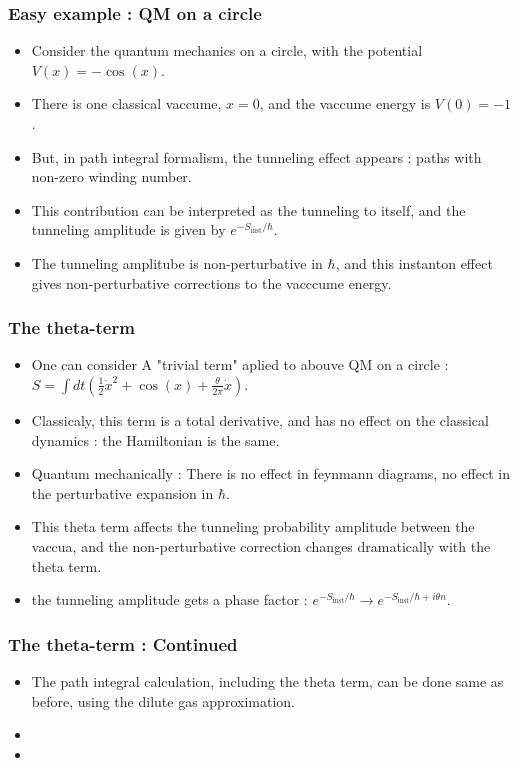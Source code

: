 \documentclass[10pt]{beamer}
\begin{document}
\begin{frame}
    \frametitle{Easy example : QM on a circle}
    \begin{itemize}
    \item Consider the quantum mechanics on a circle, with the potential $V(x) = -\cos(x)$.
    \item There is one classical vaccume, $x = 0$, and the vaccume energy is $V(0) = -1$.
    \item But, in path integral formalism, the tunneling effect appears : paths with non-zero winding number.
    \item This contribution can be interpreted as the tunneling to itself, and the tunneling amplitude is given by $e^{-S_{\text{inst}}/\hbar}$.
    \item The tunneling amplitube is non-perturbative in $\hbar$, and this instanton effect gives non-perturbative corrections to the vacccume energy.
    \end{itemize}
    \end{frame}

\begin{frame}
    \frametitle{The theta-term}
    \begin{itemize}
    \item One can consider A "trivial term" aplied to abouve QM on a circle : $S= \int dt \left(\frac{1}{2}\dot{x}^2 + \cos(x) + \frac{\theta}{2\pi} \dot{x}\right)$.
    \item Classicaly, this term is a total derivative, and has no effect on the classical dynamics : the Hamiltonian is the same.
    \item Quantum mechanically : There is no effect in feynmann diagrams, no effect in the perturbative expansion in $\hbar$.
    \item This theta term affects the tunneling probability amplitude between the vaccua, and the non-perturbative correction changes dramatically with the theta term.
    \item the tunneling amplitude gets a phase factor : $e^{-S_{\text{inst}}/\hbar} \rightarrow e^{-S_{\text{inst}}/\hbar + i\theta n}$.
    \end{itemize}
    \end{frame}


\begin{frame}
    \frametitle{The theta-term : Continued}
    \begin{itemize}
    \item The path integral calculation, including the theta term, can be done same as before, using the dilute gas approximation.
    \item 
    \item 
    \end{itemize}
    \end{frame}
\end{document}
